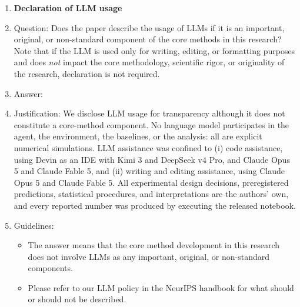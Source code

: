 \begin{enumerate}
\item {\bf Declaration of LLM usage}
    \item[] Question: Does the paper describe the usage of LLMs if it is an important, original, or non-standard component of the core methods in this research? Note that if the LLM is used only for writing, editing, or formatting purposes and does \emph{not} impact the core methodology, scientific rigor, or originality of the research, declaration is not required.
    \item[] Answer: \answerYes{}
    \item[] Justification: We disclose LLM usage for transparency although it does not constitute a core-method component. No language model participates in the agent, the environment, the baselines, or the analysis: all are explicit numerical simulations. LLM assistance was confined to (i) code assistance, using Devin as an IDE with Kimi 3 and DeepSeek v4 Pro, and Claude Opus 5 and Claude Fable 5, and (ii) writing and editing assistance, using Claude Opus 5 and Claude Fable 5. All experimental design decisions, preregistered predictions, statistical procedures, and interpretations are the authors' own, and every reported number was produced by executing the released notebook.
    \item[] Guidelines:
    \begin{itemize}
        \item The answer \answerNA{} means that the core method development in this research does not involve LLMs as any important, original, or non-standard components.
        \item Please refer to our LLM policy in the NeurIPS handbook for what should or should not be described.
    \end{itemize}

\end{enumerate}

